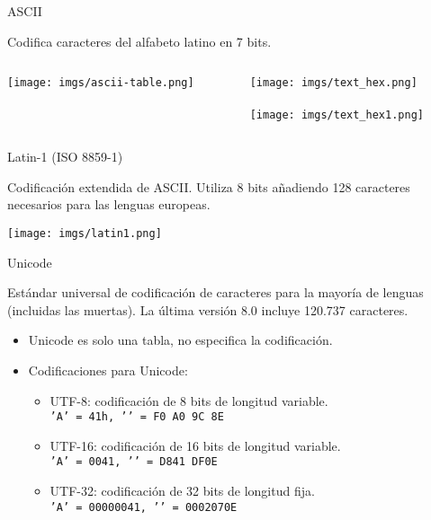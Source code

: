 \begin{frame}{ASCII}
    \begin{block}{}
        \centering Codifica caracteres del alfabeto latino en 7 bits.
    \end{block}
    \begin{columns}
    \begin{column}{0.40\textwidth}
        \texttt{[image: imgs/ascii-table.png]}
    \end{column}
    \begin{column}{0.55\textwidth}
        \centering
        \texttt{[image: imgs/text\_hex.png]} \\
        \Huge \textdownarrow \\
        \texttt{[image: imgs/text\_hex1.png]}
    \end{column}
    \end{columns}
\end{frame}

\begin{frame}{Latin-1 (ISO 8859-1)}
    \begin{block}{}
        Codificación extendida de ASCII. Utiliza 8 bits añadiendo 128 caracteres necesarios para las lenguas europeas.
    \end{block}
    \centering\texttt{[image: imgs/latin1.png]}
\end{frame}

\begin{frame}{Unicode}
    \begin{block}{}
        Estándar universal de codificación de caracteres para la mayoría de lenguas (incluidas las muertas). La última versión 8.0 incluye 120.737 caracteres.
    \end{block}

    \begin{itemize}
        \item<2-> Unicode es solo una tabla, no especifica la codificación.
        \item<3-> Codificaciones para Unicode:
        \begin{itemize}
            \item<4-> UTF-8: codificación de 8 bits de longitud variable.\\ \texttt{'A' = 41h, '}\texttt{' = F0 A0 9C 8E}
            \item<5-> UTF-16: codificación de 16 bits de longitud variable. \\ \texttt{'A' = 0041, '}\texttt{' = D841 DF0E}
            \item<6-> UTF-32: codificación de 32 bits de longitud fija. \\ \texttt{'A' = 00000041, '}\texttt{' = 0002070E}
        \end{itemize}
    \end{itemize}
\end{frame}

